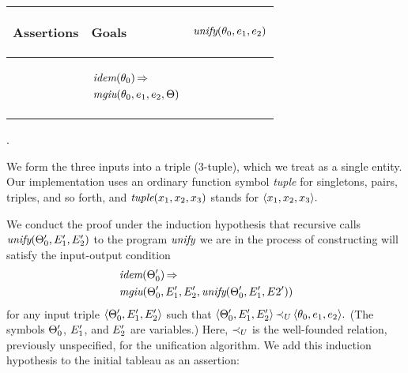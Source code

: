 \documentclass[runningheads]{llncs}
\DeclareMathOperator{\uimplies}{\Rightarrow}
\DeclareMathOperator{\unify}{\emph{unify}}
\DeclareMathOperator{\idem}{\emph{idem}}
\DeclareMathOperator{\mgiu}{\emph{mgiu}}
\begin{document}
    

\begin{center}  
\begin{tabular}{|m{}|m{}||m{}|}
 \hline
 \begin{center} Assertions\end{center} & \begin{center} Goals \end{center}& \begin{center} $\unify(\thet{0}, \e{1}, \e{2})$ \end{center} \\
 \hline\hline  
  & %
  \begin{center}
      $\begin{aligned}[t] &
  \idem(\thet{0}) \uimplies \\  &\,{\mgiu}(\thet{0}, \e{1}, \e{2}, \Theta) \\ \end{aligned}$  
  \end{center}
  & \vspace{5pt}{\begin{center}$\Theta$\end{center}} \\

\hline
\end{tabular}.
\end{center}



   We form the three inputs into a triple (3-tuple), which we treat as a single entity.
   Our implementation uses an ordinary function symbol \emph{tuple} for singletons, pairs, triples, and so forth, and $\emph{tuple}({x}_{1}, {x}_{2}, {x}_{3})$  stands for $\langle{x}_{1}, {x}_{2}, {x}_{3}\rangle.$ 
  
  We conduct the proof under the induction hypothesis that recursive calls $\unify(\Thet{0}', \E{1}',\E{2}')$ to the program $\unify$ we are in the process of constructing will satisfy the input-output condition  \begin{align*}\begin{aligned}[t] &\idem(\Thet{0}') \uimplies \\ &\,{\mgiu}(\Thet{0}', \E{1}', \E{2}' , \unify(\Thet{0}', \E{1}', E{2}'))\end{aligned}\end{align*}
for any input triple $\langle \Theta_{0}', E_{1}', E_{2}' \rangle$ such that $\langle\Theta_{0}', E_{1}', E_{2}'\rangle \, {\prec}_{U} \, \langle\theta_{0}, e_{1}, e_{2}\rangle.$ (The symbols $\Theta_{0}'$, $E_{1}'$, and $E_{2}'$ are variables.)  Here, ${\prec}_{U}$ is the well-founded relation, previously unspecified, for the unification algorithm.   We add this induction hypothesis to the initial tableau as an assertion:
\end{document}
